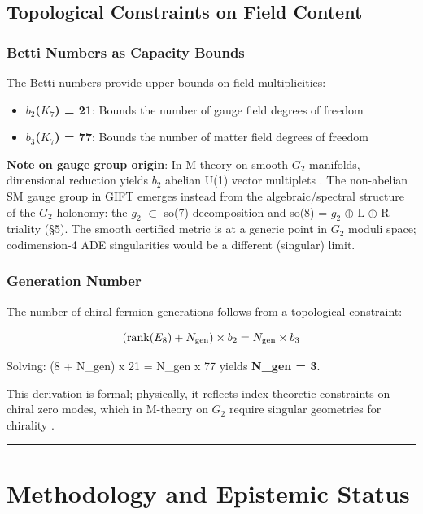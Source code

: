 \documentclass[11pt,a4paper]{article}
\begin{document}
\subsection{Topological Constraints on Field Content}

\subsubsection{Betti Numbers as Capacity Bounds}

The Betti numbers provide upper bounds on field multiplicities:

\begin{itemize}

\item
  \textbf{\(b_{2}\)(\(K_{7}\)) = 21}: Bounds the number of gauge field
  degrees of freedom
\item
  \textbf{\(b_{3}\)(\(K_{7}\)) = 77}: Bounds the number of matter field
  degrees of freedom
\end{itemize}

\textbf{Note on gauge group origin}: In M-theory on smooth \(G_{2}\)
manifolds, dimensional reduction yields \(b_{2}\) abelian U(1) vector
multiplets \cite{11}. The non-abelian SM gauge group in GIFT emerges
instead from the algebraic/spectral structure of the \(G_{2}\) holonomy:
the \(g_{2}\) \(\subset\) so(7) decomposition and so(8) = \(g_{2}\)
\(\oplus\) L \(\oplus\) R triality (§5). The smooth certified metric is
at a generic point in \(G_{2}\) moduli space; codimension-4 ADE
singularities would be a different (singular) limit.

\subsubsection{Generation Number}

The number of chiral fermion generations follows from a topological
constraint:

\[({\rm rank}(E_8) + N_{\rm gen}) \times b_2 = N_{\rm gen} \times b_3\]

Solving: (8 + N\_gen) x 21 = N\_gen x 77 yields \textbf{N\_gen = 3}.

This derivation is formal; physically, it reflects index-theoretic
constraints on chiral zero modes, which in M-theory on \(G_{2}\) require
singular geometries for chirality \cite{25}.

\noindent

\rule{\textwidth}{0.2pt}

\section{Methodology and Epistemic Status}
\end{document}
